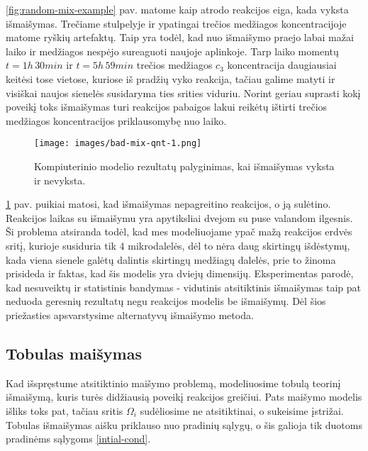 \ref{fig:random-mix-example} pav. matome kaip atrodo reakcijos eiga, kada vyksta išmaišymas. Trečiame stulpelyje ir ypatingai trečios medžiagos koncentracijoje matome ryškių artefaktų. Taip yra todėl, kad nuo išmaišymo praejo labai mažai laiko ir medžiagos nespėjo sureaguoti naujoje aplinkoje. Tarp laiko momentų $t=1h\,30min$ ir $t=5h\,59min$ trečios medžiagos $c_3$ koncentracija daugiausiai keitėsi tose vietose, kuriose iš pradžių vyko reakcija, tačiau galime matyti ir visiškai naujos sienelės susidaryma ties srities viduriu. Norint geriau suprasti kokį poveikį toks išmaišymas turi reakcijos pabaigos lakui reikėtų ištirti trečios medžiagos koncentracijos priklausomybę nuo laiko.

\newpage
\begin{figure}[h!]
    \centering
    \texttt{[image: images/bad-mix-qnt-1.png]}
    \caption{Kompiuterinio modelio rezultatų palyginimas, kai išmaišymas vyksta ir nevyksta.  }
    \label{bad-mix-qnt-example}
\end{figure}
\ref{bad-mix-qnt-example} pav. puikiai matosi, kad išmaišymas nepagreitino reakcijos, o ją sulėtino. Reakcijos laikas su išmaišymu yra apytiksliai dvejom su puse valandom ilgesnis. Ši problema atsiranda todėl, kad mes modeliuojame ypač mažą reakcijos erdvės sritį, kurioje susiduria tik 4 mikrodalelės, dėl to nėra daug skirtingų išdėstymų, kada viena sienele galėtų dalintis skirtingų medžiagų dalelės, prie to žinoma prisideda ir faktas, kad šis modelis yra dviejų dimensijų. Eksperimentas parodė, kad nesuveiktų ir statistinis bandymas - vidutinis atsitiktinis išmaišymas taip pat neduoda geresnių rezultatų negu reakcijos modelis be išmaišymų. Dėl šios priežasties apsvarstysime alternatyvų išmaišymo metoda.

\subsection{Tobulas maišymas}

Kad išspręstume atsitiktinio maišymo problemą, modeliuosime tobulą teorinį išmaišymą, kuris turės didžiausią poveikį reakcijos greičiui. Pats maišymo modelis išliks toks pat, tačiau sritis $\Omega_i$ sudėliosime ne atsitiktinai, o sukeisime įstrižai. Tobulas išmaišymas aišku priklauso nuo pradinių sąlygų, o šis galioja tik duotoms pradinėms sąlygoms \eqref{intial-cond}.

